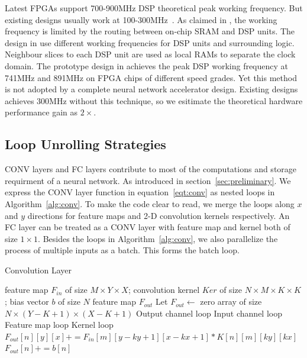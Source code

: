 Latest FPGAs support 700-900MHz DSP theoretical peak working frequency. But existing designs usually work at 100-300MHz~\cite{qiu2016going, guo2017angel, zhang2016caffeine, ma2017optimizing}. As claimed in \cite{wu2017high}, the working frequency is limited by the routing between on-chip SRAM and DSP units. The design in \cite{wu2017high} use different working frequencies for DSP units and surrounding logic. Neighbour slices to each DSP unit are used as local RAMs to separate the clock domain. The prototype design in \cite{wu2017high} achieves the peak DSP working frequency at 741MHz and 891MHz on FPGA chips of different speed grades. Yet this method is not adopted by a complete neural network accelerator design. Existing designs achieves 300MHz without this technique, so we esitimate the theoretical hardware performance gain as $2\times$.

\subsection{Loop Unrolling Strategies}\label{sec:hardware:lu}
CONV layers and FC layers contribute to most of the computations and storage requirment of a neural network. As introduced in section~\ref{sec:preliminary}. We express the CONV layer function in equation~\ref{eqt:conv} as nested loops in Algorithm~\ref{alg:conv}. To make the code clear to read, we merge the loops along $x$ and $y$ directions for feature maps and 2-D convolution kernels respectively. An FC layer can be treated as a CONV layer with feature map and kernel both of size $1\times 1$. Besides the loops in Algorithm~\ref{alg:conv}, we also parallelize the process of multiple inputs as a batch. This forms the batch loop.

\begin{algorithm}  
    \caption{Convolution Layer}
    \label{alg:conv}
    \begin{algorithmic}[1]
        \Require feature map $F_{in}$ of size $M\times Y\times X$; 
                 convolution kernel $Ker$ of size $N\times M\times K\times K$;
                 bias vector $b$ of size $N$ 
        \Ensure  feature map $F_{out}$
            \State Let $F_{out} \gets $ zero array of size $N\times(Y-K+1)\times(X-K+1)$  
             \Comment Output channel loop
                 \Comment Input channel loop
                     \Comment Feature map loop
                         \Comment Kernel loop
                            \State $F_{out}[n][y][x] += F_{in}[m][y-ky+1][x-kx+1] * K[n][m][ky][kx]$
                        \EndFor
                    \EndFor
                \EndFor
                \State $F_{out}[n] += b[n]$
            \EndFor
            \State {}
        \EndFunction  
        
    \end{algorithmic}  
\end{algorithm}

